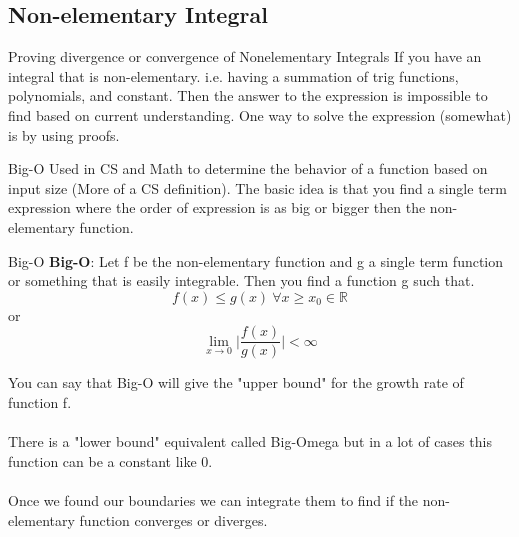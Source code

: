 \documentclass[letterpaper,10pt,twoside,twocolumn,openany]{book}
\begin{document}
\subsection{Non-elementary Integral}
\begin{paperbox}{Proving divergence or convergence of Nonelementary Integrals}
    If you have an integral that is non-elementary. i.e. having a summation of trig functions, polynomials, and constant. Then the answer to the expression is impossible to find based on current understanding. One way to solve the expression (somewhat) is by using proofs.  
\end{paperbox}
\begin{commentbox}{Big-O}
    Used in CS and Math to determine the behavior of a function based on input size (More of a CS definition). The basic idea is that you find a single term expression where the order of expression is as big or bigger then the non-elementary function.
\end{commentbox}
\newpage
\begin{paperbox}{Big-O}
    \textbf{Big-O}:
    Let f be the non-elementary function and g a single term function or something that is easily integrable. Then you find a function g such that.
    \begin{equation*}
        f(x) \leq g(x)\ \forall x \geq x_0 \in \mathbb{R}
    \end{equation*} 
    or 
    \begin{equation*}
        \lim_{x \to 0} \biggl|\frac{f(x)}{g(x)}\biggl| < \infty 
    \end{equation*}
\end{paperbox}
You can say that Big-O will give the "upper bound" for the growth rate of function f.
\\~\\ 
There is a "lower bound" equivalent called Big-Omega but in a lot of cases this function can be a constant like 0.
\\~\\ 
Once we found our boundaries we can integrate them to find if the non-elementary function converges or diverges.
\end{document}
